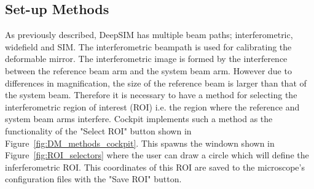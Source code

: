 \subsection{Set-up Methods}
\label{subsec:set_up_methods}

As previously described, DeepSIM has multiple beam paths; interferometric, widefield and SIM. The interferometric beampath is used for calibrating the deformable mirror. The interferometric image is formed by the interference between the reference beam arm and the system beam arm. However due to differences in magnification, the size of the reference beam is larger than that of the system beam. Therefore it is necessary to have a method for selecting the interferometric region of interest (ROI) i.e. the region where the reference and system beam arms interfere. Cockpit implements such a method as the functionality of the "Select ROI" button shown in Figure~\ref{fig:DM_methods_cockpit}. This spawns the windown shown in Figure~\ref{fig:ROI_selectors} where the user can draw a circle which will define the inferferometric ROI. This coordinates of this ROI are saved to the microscope's configuration files with the "Save ROI" button.

